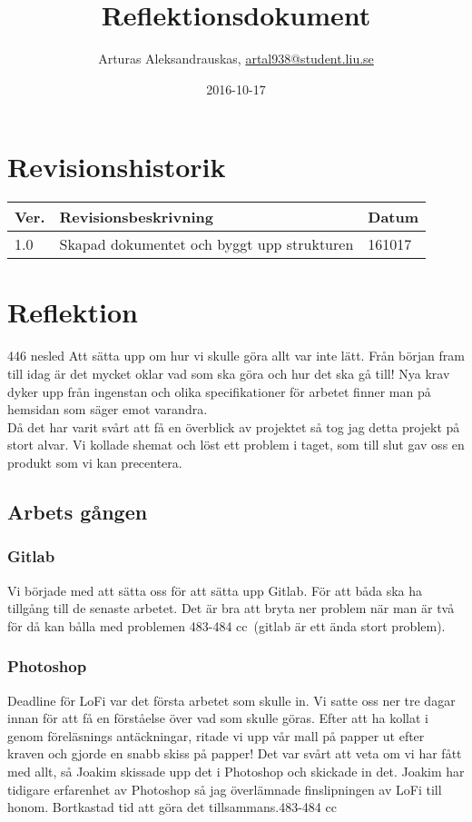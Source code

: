 \documentclass{TDP003mall}
\author{Arturas Aleksandrauskas, \url{artal938@student.liu.se}}
\title{Reflektionsdokument}
\date{2016-10-17}
\begin{document}
\projectpage
\section{Revisionshistorik}
\begin{table}[!h]
\begin{tabularx}{\linewidth}{|l|X|l|}
\hline
Ver. & Revisionsbeskrivning & Datum \\\hline
1.0 & Skapad dokumentet och byggt upp strukturen & 161017 \\\hline
\end{tabularx}
\end{table}


\section{Reflektion}
446 nesled 
Att sätta upp om hur vi skulle göra allt var inte lätt. Från början fram till idag är det mycket oklar vad som ska göra och hur det ska gå till! Nya krav dyker upp från ingenstan och olika specifikationer för arbetet finner man på hemsidan som säger emot varandra.\\ 
Då det har varit svårt att få en överblick av projektet så tog jag detta projekt på stort alvar. Vi kollade shemat och löst ett problem i taget, som till slut gav oss en produkt som vi kan precentera.  
\subsection{Arbets gången}
\subsubsection{Gitlab}
Vi började med att sätta oss för att sätta upp Gitlab. För att båda ska ha tillgång till de senaste arbetet. Det är bra att bryta ner problem när man är två för då kan bålla med problemen 483-484 cc~(gitlab är ett ända stort problem).\\
\subsubsection{Photoshop}
Deadline för LoFi var det första arbetet som skulle in. Vi satte oss ner tre dagar innan för att få en förståelse över vad som skulle göras. Efter att ha kollat i genom föreläsnings antäckningar, ritade vi upp vår mall på papper ut efter kraven och gjorde en snabb skiss på papper! Det var svårt att veta om vi har fått med allt, så Joakim skissade upp det i Photoshop och skickade in det. Joakim har tidigare erfarenhet av Photoshop så jag överlämnade finslipningen av LoFi till honom. Bortkastad tid att göra det tillsammans.483-484 cc\\
\end{document}
